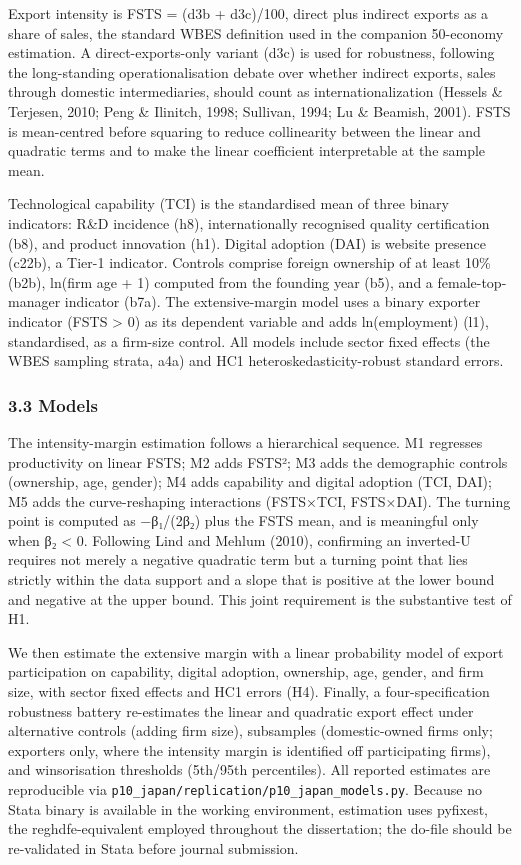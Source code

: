 \documentclass[
  12pt,a4paper]{article}
\begin{document}
Export intensity is FSTS = (d3b + d3c)/100, direct plus indirect exports
as a share of sales, the standard WBES definition used in the companion
50-economy estimation. A direct-exports-only variant (d3c) is used for
robustness, following the long-standing operationalisation debate over
whether indirect exports, sales through domestic intermediaries, should
count as internationalization (Hessels \& Terjesen, 2010; Peng \&
Ilinitch, 1998; Sullivan, 1994; Lu \& Beamish, 2001). FSTS is
mean-centred before squaring to reduce collinearity between the linear
and quadratic terms and to make the linear coefficient interpretable at
the sample mean.

Technological capability (TCI) is the standardised mean of three binary
indicators: R\&D incidence (h8), internationally recognised quality
certification (b8), and product innovation (h1). Digital adoption (DAI)
is website presence (c22b), a Tier-1 indicator. Controls comprise
foreign ownership of at least 10\% (b2b), ln(firm age + 1) computed from
the founding year (b5), and a female-top-manager indicator (b7a). The
extensive-margin model uses a binary exporter indicator (FSTS
\textgreater{} 0) as its dependent variable and adds ln(employment)
(l1), standardised, as a firm-size control. All models include sector
fixed effects (the WBES sampling strata, a4a) and HC1
heteroskedasticity-robust standard errors.

\hypertarget{models}{%
\subsubsection{3.3 Models}\label{models}}

The intensity-margin estimation follows a hierarchical sequence. M1
regresses productivity on linear FSTS; M2 adds FSTS²; M3 adds the
demographic controls (ownership, age, gender); M4 adds capability and
digital adoption (TCI, DAI); M5 adds the curve-reshaping interactions
(FSTS×TCI, FSTS×DAI). The turning point is computed as −β₁/(2β₂) plus
the FSTS mean, and is meaningful only when β₂ \textless{} 0. Following
Lind and Mehlum (2010), confirming an inverted-U requires not merely a
negative quadratic term but a turning point that lies strictly within
the data support and a slope that is positive at the lower bound and
negative at the upper bound. This joint requirement is the substantive
test of H1.

We then estimate the extensive margin with a linear probability model of
export participation on capability, digital adoption, ownership, age,
gender, and firm size, with sector fixed effects and HC1 errors (H4).
Finally, a four-specification robustness battery re-estimates the linear
and quadratic export effect under alternative controls (adding firm
size), subsamples (domestic-owned firms only; exporters only, where the
intensity margin is identified off participating firms), and
winsorisation thresholds (5th/95th percentiles). All reported estimates
are reproducible via
\texttt{p10\_japan/replication/p10\_japan\_models.py}. Because no Stata
binary is available in the working environment, estimation uses
pyfixest, the reghdfe-equivalent employed throughout the dissertation;
the do-file should be re-validated in Stata before journal submission.
\end{document}
